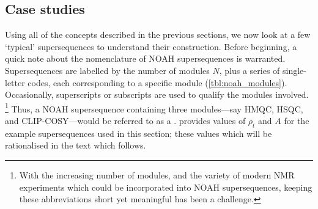 \subsection{Case studies}
\label{subsec:noah__case_studies}

Using all of the concepts described in the previous sections, we now look at a few `typical' supersequences to understand their construction.
Before beginning, a quick note about the nomenclature of NOAH supersequences is warranted.
Supersequences are labelled by the number of modules $N$, plus a series of single-letter codes, each corresponding to a specific module (\cref{tbl:noah_modules}).
Occasionally, superscripts or subscripts are used to qualify the modules involved.%
\footnote{With the increasing number of modules, and the variety of modern NMR experiments which could be incorporated into NOAH supersequences, keeping these abbreviations short yet meaningful has been a challenge.}
Thus, a NOAH supersequence containing three modules---say \nitrogen{} HMQC, \carbon{} HSQC, and CLIP-COSY---would be referred to as a .
 provides values of $\rho_t$ and $A$ for the example supersequences used in this section; these values which will be rationalised in the text which follows.

